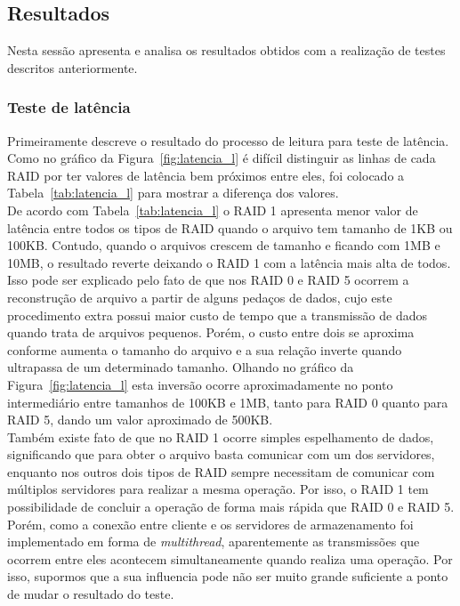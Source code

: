 
	\subsection{Resultados}
	Nesta sessão apresenta e analisa os resultados obtidos com a realização de testes descritos anteriormente.
	\\
	
	\subsubsection{Teste de latência}
	Primeiramente descreve o resultado do processo de leitura para teste de latência.
	Como no gráfico da Figura~\ref{fig:latencia_l} é difícil distinguir as linhas de cada RAID por ter valores de latência bem próximos entre eles, foi colocado a Tabela~\ref{tab:latencia_l} para mostrar a diferença dos valores.
	 \\
	 
	De acordo com Tabela~\ref{tab:latencia_l} o RAID 1 apresenta menor valor de latência entre todos os tipos de RAID quando o arquivo tem tamanho de 1KB ou 100KB. Contudo, quando o arquivos crescem de tamanho e ficando com 1MB e 10MB, o resultado reverte deixando o RAID 1 com a latência mais alta de todos. 
	Isso pode ser explicado pelo fato de que nos RAID 0 e RAID 5 ocorrem a reconstrução de arquivo a partir de alguns pedaços de dados, cujo este procedimento extra possui maior custo de tempo que a transmissão de dados quando trata de arquivos pequenos. Porém, o custo entre dois se aproxima conforme aumenta o tamanho do arquivo e a sua relação inverte quando ultrapassa de um determinado tamanho.
	Olhando no gráfico da Figura~\ref{fig:latencia_l} esta inversão ocorre aproximadamente no ponto intermediário entre tamanhos de 100KB e 1MB, tanto para RAID 0 quanto para RAID 5, dando um valor aproximado de 500KB.
	\\
	
	Também existe fato de que no RAID 1 ocorre simples espelhamento de dados, significando que para obter o arquivo basta comunicar com um dos servidores, enquanto nos outros dois tipos de RAID sempre necessitam de comunicar com múltiplos servidores para realizar a mesma operação. Por isso, o RAID 1 tem possibilidade de concluir a operação de forma mais rápida que RAID 0 e RAID 5. Porém, como a conexão entre cliente e os servidores de armazenamento foi implementado em forma de \textit{multithread}, aparentemente as transmissões que ocorrem entre eles acontecem simultaneamente quando realiza uma operação. Por isso, supormos que a sua influencia pode não ser muito grande suficiente a ponto de mudar o resultado do teste.
	\\
	
